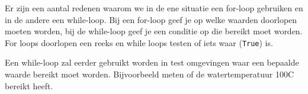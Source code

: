 Er zijn een aantal redenen waarom we in de ene situatie een for-loop gebruiken en in de andere een while-loop. Bij een for-loop geef je op welke waarden doorlopen moeten worden, bij de while-loop geef je een conditie op die bereikt moet worden. For loops doorlopen een reeks en while loops testen of iets waar (\texttt{True}) is.

Een while-loop zal eerder gebruikt worden in test omgevingen waar een bepaalde waarde bereikt moet worden. Bijvoorbeeld meten of de watertemperatuur 100\textdegree C bereikt heeft.

